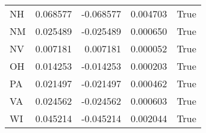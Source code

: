 \begin{table}
\begin{tabular}{lrrrl}
      NH &   0.068577 & -0.068577 &       0.004703 &          True \\
      NM &   0.025489 & -0.025489 &       0.000650 &          True \\
      NV &   0.007181 &  0.007181 &       0.000052 &          True \\
      OH &   0.014253 & -0.014253 &       0.000203 &          True \\
      PA &   0.021497 & -0.021497 &       0.000462 &          True \\
      VA &   0.024562 & -0.024562 &       0.000603 &          True \\
      WI &   0.045214 & -0.045214 &       0.002044 &          True \\
\bottomrule
\end{tabular}
\end{table}
